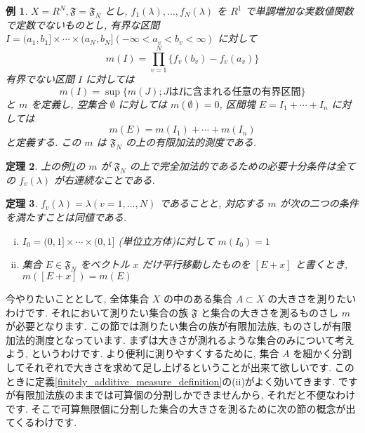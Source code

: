 \documentclass[dvipdfmx]{jsreport}
\newtheorem{theo}{定理}[section]
\newtheorem{exam}[theo]{例}
\begin{document}
\begin{exam} \label{finitely_additive_measure_example}
    $X = R^N, \mathfrak{F} = \mathfrak{F}_N$ とし, $f_1(\lambda), \dots, f_N(\lambda)$ を $R^1$ で単調増加な実数値関数で定数でないものとし, 有界な区間 $I = (a_1, b_1] \times \cdots \times (a_N, b_N] (-\infty < a_v < b_v < \infty)$ に対して
    \begin{equation}
        m(I) = \prod_{v = 1}^N \{f_v(b_v) - f_v(a_v)\}
    \end{equation}
    有界でない区間 $I$ に対しては
    \begin{equation}
        m(I) = \sup\{m(J) ; J は I に含まれる任意の有界区間\}
    \end{equation}
    と $m$ を定義し, 空集合 $\emptyset$ に対しては $m(\emptyset) = 0$, 区間塊 $E = I_1 + \cdots + I_n$ に対しては
    \begin{equation}
        m(E) = m(I_1) + \cdots + m(I_n)
    \end{equation}
    と定義する. この $m$ は $\mathfrak{F}_N$ の上の有限加法的測度である. 
\end{exam}

\begin{theo}
    上の例\ref{finitely_additive_measure_example}の $m$ が $\mathfrak{F}_N$ の上で完全加法的であるための必要十分条件は全ての $f_v(\lambda)$ が右連続なことである. 
\end{theo}

\begin{theo}
    $f_v(\lambda) = \lambda (v = 1, \dots, N)$ であることと, 対応する $m$ が次の二つの条件を満たすことは同値である. 
    \begin{enumerate}[(i)]
        \item $I_0 = (0, 1] \times \cdots \times (0, 1]$ (単位立方体)に対して $m(I_0) = 1$
        \item 集合 $E \in \mathfrak{F}_N$ をベクトル $x$ だけ平行移動したものを $[E + x]$ と書くとき, $m([E + x]) = m(E)$
    \end{enumerate}
\end{theo}

今やりたいこととして, 全体集合 $X$ の中のある集合 $A \subset X$ の大きさを測りたいわけです. それにおいて測りたい集合の族 $\mathfrak{F}$ と集合の大きさを測るものさし $m$ が必要となります. 
この節では測りたい集合の族が有限加法族, ものさしが有限加法的測度となっています. まずは大きさが測れるような集合のみについて考えよう, というわけです. より便利に測りやすくするために, 集合 $A$ を細かく分割してそれぞれで大きさを求めて足し上げるということが出来て欲しいです. 
このときに定義\ref{finitely_additive_measure_definition}の(ii)がよく効いてきます. ですが有限加法族のままでは可算個の分割しかできませんから, それだと不便なわけです. そこで可算無限個に分割した集合の大きさを測るために次の節の概念が出てくるわけです. 
\end{document}
